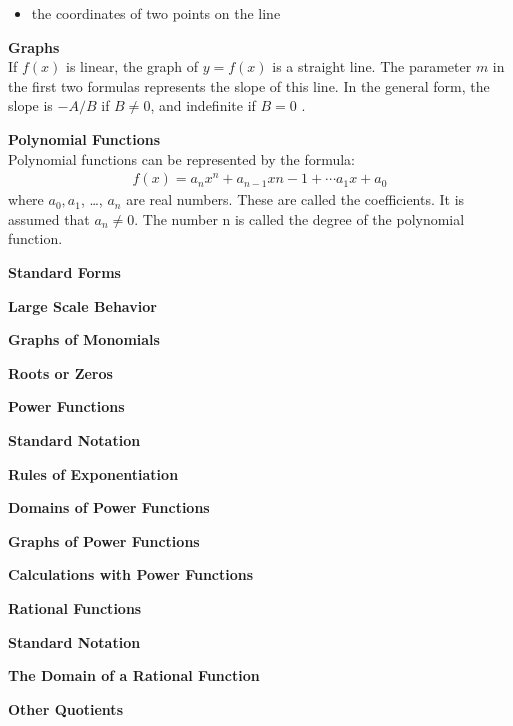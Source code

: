 \documentclass{amsart}
\begin{document}
\begin{outline}
\begin{outline}
\begin{outline}
\begin{outline}
\begin{itemize}
            \item the coordinates of two points on the line
           \end{itemize}
            \end{outline}
      \item {\bf Graphs } \\
        If $f(x)$ is linear, the graph of $y=f(x)$ is a straight line. The parameter $m$ in the first two formulas represents the slope of this line. In the general form, the slope is $-A/B$ if $B \neq 0$, and indefinite if $B=0$ \cite{oregonstatelinear}.
    \end{outline}
  \item {\bf Polynomial Functions } \\
      Polynomial functions can be represented by the formula:
      \begin{align*}
        f(x) = a_nx^n + a_{n-1}x{n-1} + \cdots a_1x + a_0
      \end{align*}
      where $a_0, a_1$, \dots , $a_n$ are real numbers. These are called the coefficients. It is assumed that $a_n \neq 0$. The number n is called the degree of the polynomial function.
    \begin{outline}
      \item {\bf Standard Forms }      
      \item {\bf Large Scale Behavior }
      \item {\bf Graphs of Monomials }
      \item {\bf Roots or Zeros }
    \end{outline}
  \item {\bf Power Functions }
    \begin{outline}
      \item {\bf Standard Notation }      
      \item {\bf Rules of Exponentiation }
      \item {\bf Domains of Power Functions }
      \item {\bf Graphs of Power Functions }
      \item {\bf Calculations with Power Functions }
    \end{outline}
  \item {\bf Rational Functions }
    \begin{outline}
      \item {\bf Standard Notation }      
      \item {\bf The Domain of a Rational Function }
      \item {\bf Other Quotients }

\end{outline}
\end{outline}
\end{outline}
\end{document}
